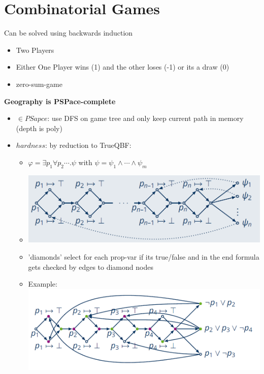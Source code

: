 \documentclass[12pt,a4paper]{article}
\begin{document}
\section{Combinatorial Games}
Can be solved using backwards induction
\begin{itemize}
\setlength\itemsep{0.05cm}
\item Two Players
\item Either One Player wins (1) and the other loses (-1) or its a draw (0)
\item zero-sum-game
\end{itemize}

\textbf{Geography is PSPace-complete}
\begin{itemize}
\item $\in PSapce$: use DFS on game tree and only keep current path in memory (depth is poly)
\item $hardness$: by reduction to TrueQBF:
\begin{itemize}
\item $\varphi = \exists p_1 \forall p_2\cdots . \psi$ with $\psi = \psi_1 \land \cdots \land \psi_m$
\item \includegraphics[scale=0.4]{./resources/geo.png}
\item 'diamonds' select for each prop-var if its true/false and in the end formula gets checked by edges to diamond nodes
\item Example:\\ \includegraphics[scale=0.4]{./resources/geoEx.png}
\end{itemize}
\end{itemize}
\end{document}
